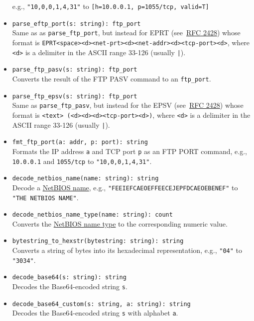 \documentclass[10pt,landscape]{article}
\begin{document}
\begin{multicols*}{2}
\begin{itemize}
    e.g., \verb|"10,0,0,1,4,31"| to \verb|[h=10.0.0.1, p=1055/tcp, valid=T]|
  \item \verb|parse_eftp_port(s: string): ftp_port|\\
    Same as as \verb|parse_ftp_port|, but instead for EPRT
    (see~\href{http://tools.ietf.org/html/rfc2428}{RFC 2428}) whose format is
    \verb|EPRT<space><d><net-prt><d><net-addr><d><tcp-port><d>|, where
    \verb|<d>| is a delimiter in the ASCII range 33-126 (usually \verb#|#).
  \item \verb|parse_ftp_pasv(s: string): ftp_port|\\
    Converts the result of the FTP PASV command to an \verb|ftp_port|.
  \item \verb|parse_ftp_epsv(s: string): ftp_port|\\
    Same as \verb|parse_ftp_pasv|, but instead for the EPSV
    (see~\href{http://tools.ietf.org/html/rfc2428}{RFC 2428}) whose format is
    \verb|<text> (<d><d><d><tcp-port><d>)|, where \verb|<d>| is a delimiter in
    the ASCII range 33-126 (usually \verb#|#).
  \item \verb|fmt_ftp_port(a: addr, p: port): string|\\
    Formats the IP address \texttt{a} and TCP port \texttt{p} as an FTP
    PORT command, e.g., \verb|10.0.0.1| and \verb|1055/tcp| to
    \verb|"10,0,0,1,4,31"|.
  \item \verb|decode_netbios_name(name: string): string|\\
    Decode a \href{http://support.microsoft.com/kb/194203}{NetBIOS name}, e.g.,
    \verb|"FEEIEFCAEOEFFEECEJEPFDCAEOEBENEF"| to \verb|"THE NETBIOS NAME"|.
  \item \verb|decode_netbios_name_type(name: string): count|\\
    Converts the \href{http://support.microsoft.com/kb/163409}{NetBIOS name
    type} to the corresponding numeric value.
  \item \verb|bytestring_to_hexstr(bytestring: string): string|\\
    Converts a string of bytes into its hexadecimal representation, e.g.,
    \verb|"04"| to \verb|"3034"|.
  \item \verb|decode_base64(s: string): string|\\
    Decodes the Base64-encoded string \verb|s|.
  \item \verb|decode_base64_custom(s: string, a: string): string|\\
    Decodes the Base64-encoded string \verb|s| with alphabet \verb|a|.

\end{itemize}
\end{multicols*}
\end{document}
